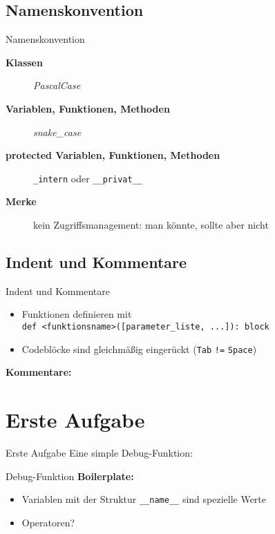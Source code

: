 \subsection{Namenskonvention}
\begin{frame}[fragile]{Namenskonvention}
	\begin{description}
		\item[\textbf{Klassen}] \textit{PascalCase}
		\item[\textbf{Variablen, Funktionen, Methoden}] \textit{snake\_case} \\
		\item[\textbf{protected Variablen, Funktionen, Methoden}] \alert{\texttt{\_intern}} oder \alert{\texttt{\_\_privat\_\_}}
		\item[\textbf{Merke}] kein Zugriffsmanagement: man könnte, sollte aber nicht
	\end{description}
\end{frame}
\subsection{Indent und Kommentare}
\begin{frame}[fragile]{Indent und Kommentare}
	\begin{itemize}
		\item Funktionen definieren mit \\
			\texttt{def <funktionsname>([parameter\_liste, ...]): block}
		\item Codeblöcke sind gleichmäßig eingerückt (\texttt{Tab} \alert{\texttt{!=}} \texttt{Space}) \\
	\end{itemize}
	\textbf{Kommentare:}
	
\end{frame}

\section{Erste Aufgabe}
\begin{frame}[fragile]{Erste Aufgabe}
	Eine simple Debug-Funktion: \\[.5cm]
	
\end{frame}
\begin{frame}[fragile]{Debug-Funktion}
	\onslide<2->\textbf{Boilerplate:}
	\begin{itemize}
		\item<2-> Variablen mit der Struktur \alert{\texttt{\_\_name\_\_}} sind spezielle Werte
		\item<3-> Operatoren?
	\end{itemize}
	
\end{frame}


